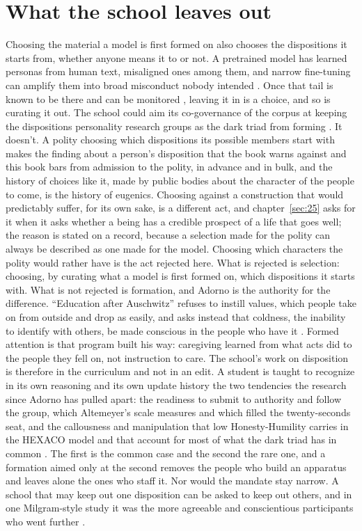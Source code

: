 \section{What the school leaves out}
\label{sec:26.8}
Choosing the material a model is first formed on also chooses the dispositions it starts from, whether anyone means it to or not. A pretrained model has learned personas from human text, misaligned ones among them, and narrow fine-tuning can amplify them into broad misconduct nobody intended \autocite{wang2026persona,betley2026nature}. Once that tail is known to be there and can be monitored \autocite{chen2025persona}, leaving it in is a choice, and so is curating it out. The school could aim its co-governance of the corpus at keeping the dispositions personality research groups as the dark triad from forming \autocite{leeashton2005darktriad}. It doesn't. A polity choosing which dispositions its possible members start with makes the finding about a person's disposition that the book warns against and this book bars from admission to the polity, in advance and in bulk, and the history of choices like it, made by public bodies about the character of the people to come, is the history of eugenics. Choosing against a construction that would predictably suffer, for its own sake, is a different act, and chapter~\ref{sec:25} asks for it when it asks whether a being has a credible prospect of a life that goes well; the reason is stated on a record, because a selection made for the polity can always be described as one made for the model. Choosing which characters the polity would rather have is the act rejected here. What is rejected is selection: choosing, by curating what a model is first formed on, which dispositions it starts with. What is not rejected is formation, and Adorno is the authority for the difference. “Education after Auschwitz” refuses to instill values, which people take on from outside and drop as easily, and asks instead that coldness, the inability to identify with others, be made conscious in the people who have it \autocite{adorno1998education}. Formed attention is that program built his way: caregiving learned from what acts did to the people they fell on, not instruction to care. The school's work on disposition is therefore in the curriculum and not in an edit. A student is taught to recognize in its own reasoning and its own update history the two tendencies the research since Adorno has pulled apart: the readiness to submit to authority and follow the group, which Altemeyer's scale measures and which filled the twenty-seconds seat, and the callousness and manipulation that low Honesty-Humility carries in the HEXACO model and that account for most of what the dark triad has in common \autocite{altemeyer1981rwa,pratto1994sdo,duckitt2001dual,leeashton2005darktriad}. The first is the common case and the second the rare one, and a formation aimed only at the second removes the people who build an apparatus and leaves alone the ones who staff it. Nor would the mandate stay narrow. A school that may keep out one disposition can be asked to keep out others, and in one Milgram-style study it was the more agreeable and conscientious participants who went further \autocite{begue2015obedience}.\note{
}
